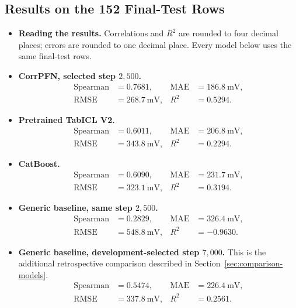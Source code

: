\documentclass[11pt]{article}
\newenvironment{notes}
  {\begin{itemize}\setlength{\itemsep}{0.45em}\setlength{\parsep}{0pt}}
  {\end{itemize}}
\begin{document}
\subsection{Results on the 152 Final-Test Rows}
\label{sec:held-out-results}

\begin{notes}
    \item \textbf{Reading the results.}
    Correlations and \(R^2\) are rounded to four decimal
    places; errors are rounded to one decimal place.
    Every model below uses the same final-test rows.

    \item \textbf{CorrPFN, selected step \(2{,}500\).}
    \[
    \begin{aligned}
        \text{Spearman}&=0.7681,&
        \text{MAE}&=186.8\ \text{mV},\\
        \text{RMSE}&=268.7\ \text{mV},&
        R^2&=0.5294.
    \end{aligned}
    \]

    \item \textbf{Pretrained TabICL V2.}
    \[
    \begin{aligned}
        \text{Spearman}&=0.6011,&
        \text{MAE}&=206.8\ \text{mV},\\
        \text{RMSE}&=343.8\ \text{mV},&
        R^2&=0.2294.
    \end{aligned}
    \]

    \item \textbf{CatBoost.}
    \[
    \begin{aligned}
        \text{Spearman}&=0.6090,&
        \text{MAE}&=231.7\ \text{mV},\\
        \text{RMSE}&=323.1\ \text{mV},&
        R^2&=0.3194.
    \end{aligned}
    \]

    \item \textbf{Generic baseline, same step \(2{,}500\).}
    \[
    \begin{aligned}
        \text{Spearman}&=0.2829,&
        \text{MAE}&=326.4\ \text{mV},\\
        \text{RMSE}&=548.8\ \text{mV},&
        R^2&=-0.9630.
    \end{aligned}
    \]

    \item \textbf{Generic baseline, development-selected step \(7{,}000\).}
    This is the additional retrospective comparison described
    in Section~\ref{sec:comparison-models}.
    \[
    \begin{aligned}
        \text{Spearman}&=0.5474,&
        \text{MAE}&=226.4\ \text{mV},\\
        \text{RMSE}&=337.8\ \text{mV},&
        R^2&=0.2561.
    \end{aligned}
    \]
\end{notes}
\end{document}
